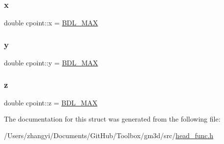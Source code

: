 \mbox{\label{structcpoint_a8668211511f21152b39662749f934ba0}} 
\subsubsection{\texorpdfstring{x}{x}}
{\footnotesize\ttfamily double cpoint\+::x = \mbox{\hyperlink{head__func_8h_a171f39ecf5d0b8067fd66e19e82f334d}{B\+D\+L\+\_\+\+M\+AX}}}

\mbox{\label{structcpoint_a717acc3777220676c593ab92e08115b6}} 
\subsubsection{\texorpdfstring{y}{y}}
{\footnotesize\ttfamily double cpoint\+::y = \mbox{\hyperlink{head__func_8h_a171f39ecf5d0b8067fd66e19e82f334d}{B\+D\+L\+\_\+\+M\+AX}}}

\mbox{\label{structcpoint_a2e66f7e13b28a8344755e564bb096cfa}} 
\subsubsection{\texorpdfstring{z}{z}}
{\footnotesize\ttfamily double cpoint\+::z = \mbox{\hyperlink{head__func_8h_a171f39ecf5d0b8067fd66e19e82f334d}{B\+D\+L\+\_\+\+M\+AX}}}



The documentation for this struct was generated from the following file\+:\begin{DoxyCompactItemize}
\item 
/\+Users/zhangyi/\+Documents/\+Git\+Hub/\+Toolbox/gm3d/src/\mbox{\hyperlink{head__func_8h}{head\+\_\+func.\+h}}\end{DoxyCompactItemize}
